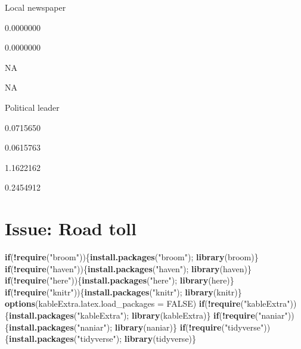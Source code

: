 \documentclass[]{book}
\newenvironment{Shaded}{\begin{snugshade}}{\end{snugshade}}
\newcommand{\KeywordTok}[1]{\textcolor[rgb]{0.13,0.29,0.53}{\textbf{#1}}}
\newcommand{\DataTypeTok}[1]{\textcolor[rgb]{0.13,0.29,0.53}{#1}}
\newcommand{\StringTok}[1]{\textcolor[rgb]{0.31,0.60,0.02}{#1}}
\newcommand{\OtherTok}[1]{\textcolor[rgb]{0.56,0.35,0.01}{#1}}
\newcommand{\ControlFlowTok}[1]{\textcolor[rgb]{0.13,0.29,0.53}{\textbf{#1}}}
\newcommand{\OperatorTok}[1]{\textcolor[rgb]{0.81,0.36,0.00}{\textbf{#1}}}
\newcommand{\NormalTok}[1]{#1}
\begin{document}
Local newspaper

0.0000000

0.0000000

NA

NA

Political leader

0.0715650

0.0615763

1.1622162

0.2454912

\chapter{Issue: Road toll}\label{issue-road-toll}

\begin{Shaded}
\begin{Highlighting}[]
\ControlFlowTok{if}\NormalTok{(}\OperatorTok{!}\KeywordTok{require}\NormalTok{(}\StringTok{"broom"}\NormalTok{))\{}\KeywordTok{install.packages}\NormalTok{(}\StringTok{"broom"}\NormalTok{);  }\KeywordTok{library}\NormalTok{(broom)\}}
\ControlFlowTok{if}\NormalTok{(}\OperatorTok{!}\KeywordTok{require}\NormalTok{(}\StringTok{"haven"}\NormalTok{))\{}\KeywordTok{install.packages}\NormalTok{(}\StringTok{"haven"}\NormalTok{);  }\KeywordTok{library}\NormalTok{(haven)\}}
\ControlFlowTok{if}\NormalTok{(}\OperatorTok{!}\KeywordTok{require}\NormalTok{(}\StringTok{"here"}\NormalTok{))\{}\KeywordTok{install.packages}\NormalTok{(}\StringTok{"here"}\NormalTok{);  }\KeywordTok{library}\NormalTok{(here)\}}
\ControlFlowTok{if}\NormalTok{(}\OperatorTok{!}\KeywordTok{require}\NormalTok{(}\StringTok{"knitr"}\NormalTok{))\{}\KeywordTok{install.packages}\NormalTok{(}\StringTok{"knitr"}\NormalTok{);  }\KeywordTok{library}\NormalTok{(knitr)\}}
\KeywordTok{options}\NormalTok{(}\DataTypeTok{kableExtra.latex.load_packages =} \OtherTok{FALSE}\NormalTok{) }
\ControlFlowTok{if}\NormalTok{(}\OperatorTok{!}\KeywordTok{require}\NormalTok{(}\StringTok{"kableExtra"}\NormalTok{))\{}\KeywordTok{install.packages}\NormalTok{(}\StringTok{"kableExtra"}\NormalTok{);  }\KeywordTok{library}\NormalTok{(kableExtra)\}}
\ControlFlowTok{if}\NormalTok{(}\OperatorTok{!}\KeywordTok{require}\NormalTok{(}\StringTok{"naniar"}\NormalTok{))\{}\KeywordTok{install.packages}\NormalTok{(}\StringTok{"naniar"}\NormalTok{);  }\KeywordTok{library}\NormalTok{(naniar)\}}
\ControlFlowTok{if}\NormalTok{(}\OperatorTok{!}\KeywordTok{require}\NormalTok{(}\StringTok{"tidyverse"}\NormalTok{))\{}\KeywordTok{install.packages}\NormalTok{(}\StringTok{"tidyverse"}\NormalTok{);  }\KeywordTok{library}\NormalTok{(tidyverse)\}}


\end{Highlighting}
\end{Shaded}
\end{document}
